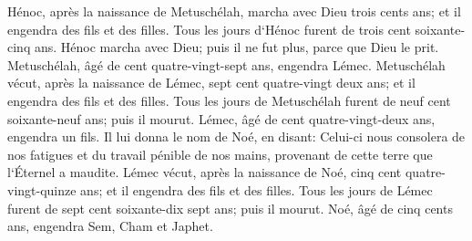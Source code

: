 \verse Hénoc, après la naissance de Metuschélah, marcha avec Dieu trois cents ans; et il engendra des fils et des filles. 
\verse Tous les jours d`Hénoc furent de trois cent soixante-cinq ans. 
\verse Hénoc marcha avec Dieu; puis il ne fut plus, parce que Dieu le prit. 
\verse Metuschélah, âgé de cent quatre-vingt-sept ans, engendra Lémec. 
\verse Metuschélah vécut, après la naissance de Lémec, sept cent quatre-vingt deux ans; et il engendra des fils et des filles. 
\verse Tous les jours de Metuschélah furent de neuf cent soixante-neuf ans; puis il mourut. 
\verse Lémec, âgé de cent quatre-vingt-deux ans, engendra un fils. 
\verse Il lui donna le nom de Noé, en disant: Celui-ci nous consolera de nos fatigues et du travail pénible de nos mains, provenant de cette terre que l`Éternel a maudite. 
\verse Lémec vécut, après la naissance de Noé, cinq cent quatre-vingt-quinze ans; et il engendra des fils et des filles. 
\verse Tous les jours de Lémec furent de sept cent soixante-dix sept ans; puis il mourut. 
\verse Noé, âgé de cinq cents ans, engendra Sem, Cham et Japhet. 

